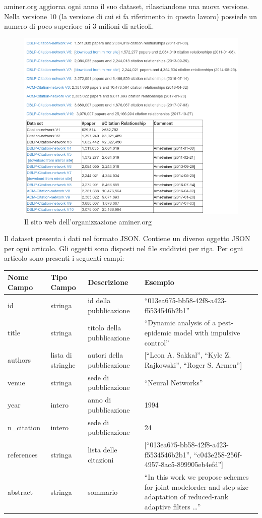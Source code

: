 \documentclass[a4paper,12pt]{article}
\begin{document}
aminer.org aggiorna ogni anno il suo dataset, rilasciandone una nuova versione. Nella versione 10 (la versione di cui si fa riferimento in questo lavoro) possiede un numero di poco superiore ai 3 milioni di articoli. \\
\begin{figure}[h!]
  \includegraphics[width=\linewidth]{images/aminer.jpg}
  \caption{Il sito web dell'organizzazione aminer.org}
\end{figure}

Il dataset presenta i dati nel formato JSON. Contiene un diverso oggetto JSON per ogni articolo. Gli oggetti sono disposti nel file suddivisi per riga.
Per ogni articolo sono presenti i seguenti campi: \\
\begin{tabularx}{\textwidth}{| X | X | X | X |}
\hline \textbf{Nome Campo} & \textbf{Tipo Campo} & \textbf{Descrizione} & \textbf{Esempio} \\
\hline id & stringa & id della pubblicazione & ``013ea675-bb58-42f8-a423-f5534546b2b1''\\
\hline title & stringa & titolo della pubblicazione & ``Dynamic analysis of a pest-epidemic model with impulsive control'' \\
\hline authors & lista di stringhe & autori della pubblicazione & [``Leon A. Sakkal'', ``Kyle Z. Rajkowski'', ``Roger S. Armen'']\\
\hline venue & stringa & sede di pubblicazione & ``Neural Networks'' \\
\hline year & intero & anno di pubblicazione & 1994 \\
\hline n\_citation & intero & sede di pubblicazione & 24 \\
\hline references & stringa & lista delle citazioni & [``013ea675-bb58-42f8-a423-f5534546b2b1'', ``c043e258-256f-4957-8ac5-899905eb4efd'']\\
\hline abstract & stringa & sommario & ``In this work we propose schemes for joint modelorder and step-size adaptation of reduced-rank adaptive filters \ldots''\\
\hline
\end{tabularx}
\end{document}
